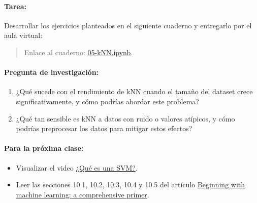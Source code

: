 \documentclass[a4,11pt]{aleph-notas}
\begin{document}
\paragraph{Tarea:}
Desarrollar los ejercicios planteados en el siguiente cuaderno y entregarlo por el aula virtual:
\begin{quote}
    Enlace al cuaderno: \href{https://colab.research.google.com/github/andres-merino/AprendizajeAutomaticoInicial-05-N0105/blob/main/2-Ejercicios/05-kNN.ipynb}{05-kNN.ipynb}.
\end{quote}

\paragraph{Pregunta de investigación:}  
\begin{enumerate}[leftmargin=*]
    \item ¿Qué sucede con el rendimiento de kNN cuando el tamaño del dataset crece significativamente, y cómo podrías abordar este problema?
    \item ¿Qué tan sensible es kNN a datos con ruido o valores atípicos, y cómo podrías preprocesar los datos para mitigar estos efectos?
\end{enumerate}

\paragraph{Para la próxima clase:}  
\begin{itemize}
    \item Visualizar el video \href{https://www.youtube.com/watch?v=jo9slrXKKNo}{¿Qué es una SVM?}.
    \item Leer las secciones 10.1, 10.2, 10.3, 10.4 y 10.5  del artículo \href{https://link.springer.com/article/10.1140/epjs/s11734-021-00209-7}{Beginning with machine learning: a comprehensive primer}.
\end{itemize}
\end{document}
